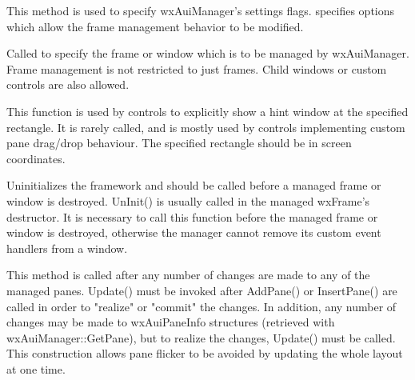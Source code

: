 \label{wxauimanagersetflags}


This method is used to specify wxAuiManager's settings flags. 
specifies options which allow the frame management behavior to be modified.

\label{wxauimanagersetmanagedwindow}


Called to specify the frame or window which is to be managed by wxAuiManager.  Frame management is not restricted to just frames.  Child windows or custom controls are also allowed.

\label{wxauimanagershowhint}


This function is used by controls to explicitly show a hint window at the specified rectangle.  It is rarely called, and is mostly used by controls implementing custom pane drag/drop behaviour.  The specified rectangle should be in screen coordinates.

\label{wxauimanageruninit}


Uninitializes the framework and should be called before a managed frame or window is destroyed. UnInit() is usually called in the managed wxFrame's destructor.  It is necessary to call this function before the managed frame or window is destroyed, otherwise the manager cannot remove its custom event handlers from a window.

\label{wxauimanagerupdate}


This method is called after any number of changes are
made to any of the managed panes. Update() must be invoked after
AddPane() or InsertPane() are called in order to "realize" or "commit"
the changes. In addition, any number of changes may be made to
wxAuiPaneInfo structures (retrieved with wxAuiManager::GetPane), but to
realize the changes, Update() must be called. This construction allows
pane flicker to be avoided by updating the whole layout at one time.

